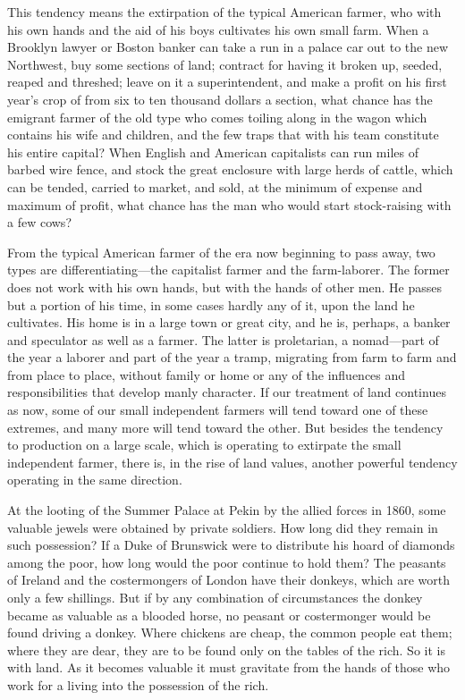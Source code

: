\documentclass{book}
\begin{document}
This tendency means the extirpation of the typical American farmer, who with his own hands and the aid of his boys cultivates his own small farm. When a Brooklyn lawyer or Boston banker can take a run in a palace car out to the new Northwest, buy some sections of land; contract for having it broken up, seeded, reaped and threshed; leave on it a superintendent, and make a profit on his first year’s crop of from six to ten thousand dollars a section, what chance has the emigrant farmer of the old type who comes toiling along in the wagon which contains his wife and children, and the few traps that with his team constitute his entire capital? When English and American capitalists can run miles of barbed wire fence, and stock the great enclosure with large herds of cattle, which can be tended, carried to market, and sold, at the minimum of expense and maximum of profit, what chance has the man who would start stock-raising with a few cows?

From the typical American farmer of the era now beginning to pass away, two types are differentiating—the capitalist farmer and the farm-laborer. The former does not work with his own hands, but with the hands of other men. He passes but a portion of his time, in some cases hardly any of it, upon the land he cultivates. His home is in a large town or great city, and he is, perhaps, a banker and speculator as well as a farmer. The latter is proletarian, a nomad—part of the year a laborer and part of the year a tramp, migrating from farm to farm and from place to place, without family or home or any of the influences and responsibilities that develop manly character. If our treatment of land continues as now, some of our small independent farmers will tend toward one of these extremes, and many more will tend toward the other. But besides the tendency to production on a large scale, which is operating to extirpate the small independent farmer, there is, in the rise of land values, another powerful tendency operating in the same direction.

At the looting of the Summer Palace at Pekin by the allied forces in 1860, some valuable jewels were obtained by private soldiers. How long did they remain in such possession? If a Duke of Brunswick were to distribute his hoard of diamonds among the poor, how long would the poor continue to hold them? The peasants of Ireland and the costermongers of London have their donkeys, which are worth only a few shillings. But if by any combination of circumstances the donkey became as valuable as a blooded horse, no peasant or costermonger would be found driving a donkey. Where chickens are cheap, the common people eat them; where they are dear, they are to be found only on the tables of the rich. So it is with land. As it becomes valuable it must gravitate from the hands of those who work for a living into the possession of the rich.
\end{document}
